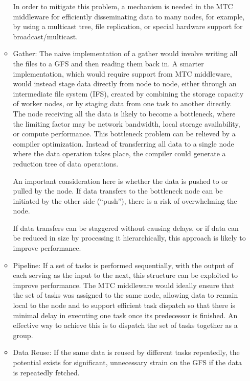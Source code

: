 \documentclass[10pt,letterpaper]{article}
\begin{document}
\begin{itemize}
\begin{itemize}
    In order to mitigate this problem, a mechanism is needed in the MTC middleware for efficiently disseminating
    data to many nodes, for example, by using a multicast tree, file replication, or special hardware support for broadcast/multicast.

  \item Gather: The naive implementation of a gather would involve
    writing all the files to a GFS and then reading them back in.  A
    smarter implementation, which would require support from MTC
    middleware, would instead stage data directly from node to node,
    either through an  intermediate file system (IFS),
    created by combining the storage
     capacity of worker nodes,
    or by staging data from one task to another
    directly.  The node receiving all the data is likely to become a
    bottleneck, where the limiting factor may be network bandwidth,
    local storage availability, or compute performance. This
    bottleneck problem can be relieved by a compiler optimization.
    Instead of transferring all data to a single node where the data
    operation takes place, the compiler could generate a reduction
    tree of data operations.

    An important consideration here is whether the data is pushed to
    or pulled by the node.  If data transfers to the bottleneck node
    can be initiated by the other side (``push''), there is a risk of
    overwhelming the node.

    If data transfers can be staggered without causing delays, or if data
    can be reduced in size by processing it hierarchically, this approach is
    likely to improve performance.

  \item Pipeline: If a set of tasks is performed sequentially,
    with the output of each serving as the input to the next, this
    structure can be exploited to improve performance.  The MTC
    middleware would ideally ensure that the set of tasks was 
    assigned to the same node, allowing data to remain local to the
    node and to support efficient task dispatch so that there is
    minimal delay in executing one task once its predecessor is
    finished.  An effective way to achieve this is to dispatch the set
    of tasks together as a group.

  \item Data Reuse: If the same data is reused by different tasks
    repeatedly, the potential exists for significant, unnecessary
    strain on the GFS if the data is repeatedly fetched.


\end{itemize}
\end{itemize}
\end{document}
